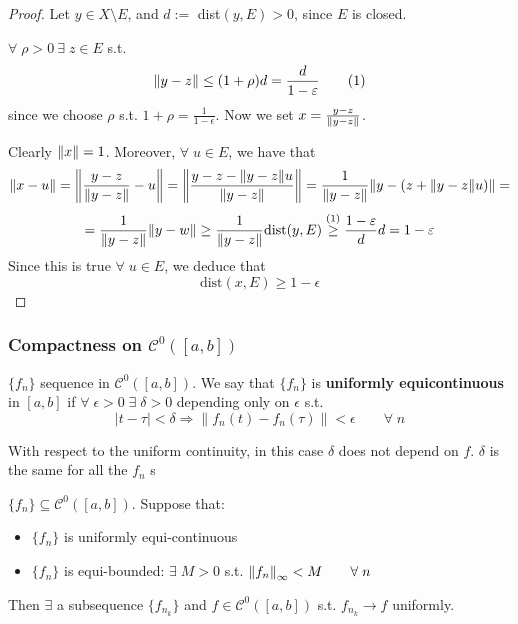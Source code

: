\begin{proof}
    Let \(y \in X \setminus E\), and \(d := \) dist\((y, E) >0\), since \(E\) is closed. 
    
    \(\forall \; \rho > 0 \ \exists \; z \in E \) s.t.
    \[
        \norm{y-z} \leq (1+\rho)d = \frac{d}{1-\varepsilon} \tag{1}
    \]
    since we choose \(\rho\) s.t. \(1+\rho = \frac{1}{1-\epsilon}\). Now we set \(x = \frac{y-z}{\norm{y-z}}\).

    Clearly \(\norm{x}=1\). Moreover, \(\forall \; u \in E\), we have that
    \[
        \norm{x-u} = \norm{ \frac{y-z}{\norm{y-z}} - u }
        = \norm{ \frac{y-z -\norm{y-z}u }{\norm{y-z}} }
        = \frac{1}{\norm{y-z}} \norm{y-(z + \norm{y-z}u)} =
    \]
    \[
        = \frac{1}{\norm{y-z}} \norm{y-w}
        \geq \frac{1}{\norm{y-z}} \text{dist}(y, E)
        \overset{(1)}{\geq} \frac{1-\varepsilon}{d} d = 1 - \varepsilon
    \]
    Since this is true \(\forall \; u \in E\), we deduce that
    \[
        \text{dist}(x, E) \geq 1-\epsilon
    \]
\end{proof}

\subsubsection*{Compactness on \(\mathcal{C}^0(\left[a, b\right])\)}
\begin{definition}
    \(\{f_n\}\) sequence in \(\mathcal{C}^0(\left[a, b\right])\). 
    We say that \(\{f_n\}\) is \textbf{uniformly equicontinuous} in \([a, b]\) if \(\forall \; \epsilon >0 \; \exists \; \delta >0 \) depending only on \(\epsilon \) s.t. 
    \[
        |t-\tau| < \delta \Rightarrow \| f_n(t) - f_n(\tau) \| < \epsilon \qquad \forall \; n
    \]
\end{definition}

\begin{remark}
    With respect to the uniform continuity, in this case \(\delta\) does not depend on \(f\). \(\delta\) is the same for all the \(f_n\) s
\end{remark}

\begin{theorem}
    \(\{f_n\} \subseteq \mathcal{C}^0(\left[a, b\right])\). Suppose that:
    \begin{itemize}
        \item \(\{f_n\}\) is uniformly equi-continuous
        \item \(\{f_n\}\) is equi-bounded: \(\exists \; M>0\) s.t. \(\norm{f_n}_\infty <M \qquad \forall \; n\)
    \end{itemize}
    Then \(\exists\) a subsequence \(\{f_{n_k}\}\) and \(f \in \mathcal{C}^0(\left[a, b\right])\) s.t. \(f_{n_k} \rightarrow f \) uniformly.
\end{theorem}

